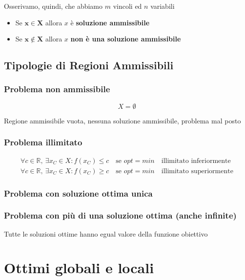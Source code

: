 Osserivamo, quindi, che abbiamo $m$ vincoli ed $n$ variabili
\begin{itemize}
    \item Se $\mathbf{x \in X}$ allora $x$ è \textbf{soluzione ammissibile}
    \item Se $\mathbf{x \not \in X}$ allora $x$ \textbf{non è una soluzione ammissibile}
\end{itemize}

\subsection{Tipologie di Regioni Ammissibili}

\subsubsection{Problema non ammissibile}
{
    \large

    $$
        X = \emptyset
    $$
}
Regione ammissibile vuota, nessuna soluzione ammissibile, problema mal posto

\subsubsection{Problema illimitato}
\begin{gather*}
    \forall c \in \mathbb{R},\ \exists x_C \in X : f(x_C) \leq c \quad \text{se } opt = min \quad \text{illimitato inferiormente} \\
    \forall c \in \mathbb{R},\ \exists x_C \in X : f(x_C) \geq c \quad \text{se } opt = min \quad \text{illimitato superiormente}
\end{gather*}

\subsubsection{Problema con soluzione ottima unica}

\subsubsection{Problema con più di una soluzione ottima (anche infinite)}
Tutte le soluzioni ottime hanno egual valore della funzione obiettivo

\newpage
\section{Ottimi globali e locali}

